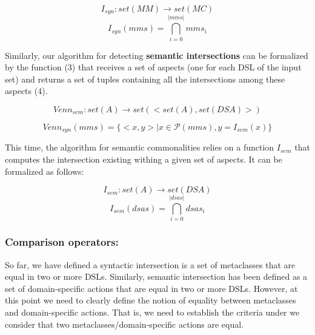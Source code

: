 \begin{equation}
  I_{syn} : set(MM) \rightarrow set(MC)
\end{equation}
\vspace{-2mm}
\begin{equation}
  I_{syn}(mms) = \bigcap _{i=0}^{|mms|}mms_i
\end{equation}

Similarly, our algorithm for detecting \textbf{semantic intersections} can be formalized by the function (3) that receives a set of aspects (one for each DSL of the input set) and returns a set of tuples containing all the intersections among these aspects (4). 

\begin{equation}
  Venn_{sem} : set(A) \rightarrow set(<set(A),set(DSA)>)
\end{equation}

\begin{equation}
  Venn_{syn}(mms) = \{<x,y> \mid x \in \mathcal{P}(mms), y = I_{sem}(x)\}
\end{equation}
\vspace{2mm}

This time, the algorithm for semantic commonalities relies on a function $I_{sem}$ that computes the intersection existing withing a given set of aspects. It can be formalized as follows:

\begin{equation}
  I_{sem} : set(A) \rightarrow set(DSA)
\end{equation}
\vspace{-2mm}
\begin{equation}
  I_{sem}(dsas) = \bigcap _{i=0}^{|dsas|}dsas_i
\end{equation}

\subsubsection{Comparison operators:} So far, we have defined a syntactic intersection is a set of metaclasses that are equal in two or more DSLs. Similarly, semantic intersection has been defined as a set of domain-specific actions that are equal in two or more DSLs. However, at this point we need to clearly define the notion of equality between metaclasses and domain-specific actions. That is, we need to establish the criteria under we consider that two metaclasses/domain-specific actions are equal.

